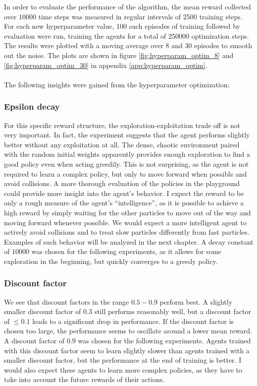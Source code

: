 In order to evaluate the performance of the algorithm, the mean reward collected over 10000 time steps was measured in regular intervals of 2500 training steps. For each new hyperparameter value, 100 such episodes of training followed by evaluation were run, training the agents for a total of 250000 optimization steps. The results were plotted with a moving average over 8 and 30 episodes to smooth out the noise. The plots are shown in figure \ref{fig:hyperparam_optim_8} and \ref{fig:hyperparam_optim_30} in appendix \ref{app:hyperparam_optim}.
\\
\\
The following insights were gained from the hyperparameter optimization:
\subsubsection{Epsilon decay}
For this specific reward structure, the exploration-exploitation trade off is not very important. In fact, the experiment suggests that the agent performs slightly better without any exploitation at all. The dense, chaotic environment paired with the random initial weights apparently provides enough exploration to find a good policy even when acting greedily. This is not surprising, as the agent is not required to learn a complex policy, but only to move forward when possible and avoid collisions. A more thorough evaluation of the policies in the playground could provide more insight into the agent's behavior. I expect the reward to be only a rough measure of the agent's \enquote{intelligence}, as it is possible to achieve a high reward by simply waiting for the other particles to move out of the way and moving forward whenever possible. We would expect a more intelligent agent to actively avoid collisions and to treat slow particles differently from fast particles. Examples of such behavior will be analyzed in the next chapter. A decay constant of $10000$ was chosen for the following experiments, as it allows for some exploration in the beginning, but quickly converges to a greedy policy.

\subsubsection{Discount factor}
We see that discount factors in the range $0.5-0.9$ perform best. A slightly smaller discount factor of $0.3$ still performs reasonably well, but a discount factor of $\le0.1$ leads to a significant drop in performance. If the discount factor is chosen too large, the performance seems to oscillate around a lower mean reward. A discount factor of $0.9$ was chosen for the following experiments. Agents trained with this discount factor seem to learn slightly slower than agents trained with a smaller discount factor, but the performance at the end of training is better. I would also expect these agents to learn more complex policies, as they have to take into account the future rewards of their actions. 

